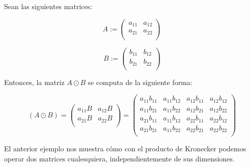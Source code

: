 \begin{ejemplo}

Sean las siguientes matrices:

    \begin{equation}
        A := \begin{pmatrix}
            a_{11} & a_{12} \\
            a_{21} & a_{22} \\
        \end{pmatrix}
    \end{equation}

    \begin{equation}
        B := \begin{pmatrix}
            b_{11} & b_{12} \\
            b_{21} & b_{22} \\
        \end{pmatrix}
    \end{equation}

    Entonces, la matriz $A \odot B$ se computa de la siguiente forma:

    \begin{equation}
        (A \odot B) = \begin{pmatrix}
            a_{11}B & a_{12}B \\
            a_{21}B & a_{22}B \\
        \end{pmatrix} =
        \begin{pmatrix}
            a_{11} b_{11} & a_{11} b_{12} & a_{12} b_{11} & a_{12} b_{12} \\
            a_{11} b_{21} & a_{11} b_{22} & a_{12} b_{21} & a_{12} b_{22} \\
            a_{21} b_{11} & a_{11} b_{12} & a_{22} b_{11} & a_{22} b_{12} \\
            a_{21} b_{21} & a_{11} b_{22} & a_{22} b_{21} & a_{22} b_{22} \\
        \end{pmatrix}
    \end{equation}

\end{ejemplo}

\begin{observacion}
    El anterior ejemplo nos muestra cómo con el producto de Kronecker podemos operar dos matrices cualesquiera, independientemente de sus dimensiones.
\end{observacion}

